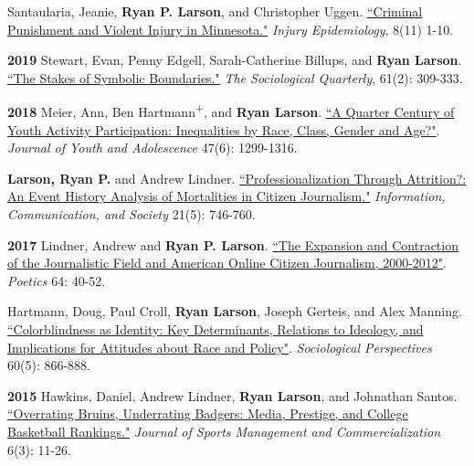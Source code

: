 \documentclass[letterpaper]{article}
\newenvironment{publist}{%
  \begin{list}{}{%
    \setlength{\leftmargin}{0cm}   %
    \setlength{\labelwidth}{2cm}     %
    \setlength{\labelsep}{0.5cm}     %
  }%
}{%
  \end{list}%
}
\begin{document}
\begin{publist}
\item  Santaularia, Jeanie, \textbf{Ryan P. Larson}, and Christopher Uggen. \href{https://ryanplarson.github.io/personal_site/pubs/santaularia_etal_21.pdf}{``Criminal Punishment and Violent Injury in Minnesota."} \textit{Injury Epidemiology}, 8(11) 1-10.

\item[\textbf{2019}] Stewart, Evan, Penny Edgell, Sarah-Catherine Billups, and \textbf{Ryan Larson}. \href{https://ryanplarson.github.io/personal_site/pubs/stewart_etal_19.pdf}{``The Stakes of Symbolic Boundaries."} \textit{The Sociological Quarterly}, 61(2): 309-333.

\item[\textbf{2018}] Meier, Ann, Ben Hartmann\textsuperscript{+}, and \textbf{Ryan Larson}.  \href{https://ryanplarson.github.io/personal_site/pubs/meier_etal_18.pdf}{``A Quarter Century of Youth Activity Participation: Inequalities by Race, Class, Gender and Age?"}. \textit{Journal of Youth and Adolescence} 47(6): 1299-1316.

\item \textbf{Larson, Ryan P.} and Andrew Lindner. \href{https://ryanplarson.github.io/personal_site/pubs/larson_lindner_18.pdf}{``Professionalization Through Attrition?: An Event History Analysis of Mortalities in Citizen Journalism."}  \textit{Information, Communication, and Society} 21(5): 746-760.

\item[\textbf{2017}] Lindner, Andrew and \textbf{Ryan P. Larson}. \href{https://ryanplarson.github.io/personal_site/pubs/lindner_larson_17.pdf}{``The Expansion and Contraction of the Journalistic Field and American Online Citizen Journalism, 2000-2012"}. \textit{Poetics} 64: 40-52.

\item Hartmann, Doug, Paul Croll, \textbf{Ryan Larson}, Joseph Gerteis, and  Alex Manning. \href{https://ryanplarson.github.io/personal_site/pubs/hartmann_etal_17.pdf}{``Colorblindness as Identity:  Key Determinants, Relations to Ideology, and Implications for Attitudes about Race and Policy"}. \textit{Sociological Perspectives} 60(5): 866-888.

\item[\textbf{2015}] Hawkins, Daniel, Andrew Lindner, \textbf{Ryan Larson}, and Johnathan Santos. \href{https://ryanplarson.github.io/personal_site/pubs/hawkins_etal_15.pdf}{``Overrating Bruins, Underrating Badgers: Media, Prestige, and College Basketball Rankings."} \textit{Journal of Sports Management and Commercialization} 6(3): 11-26.

\end{publist}
\end{document}
